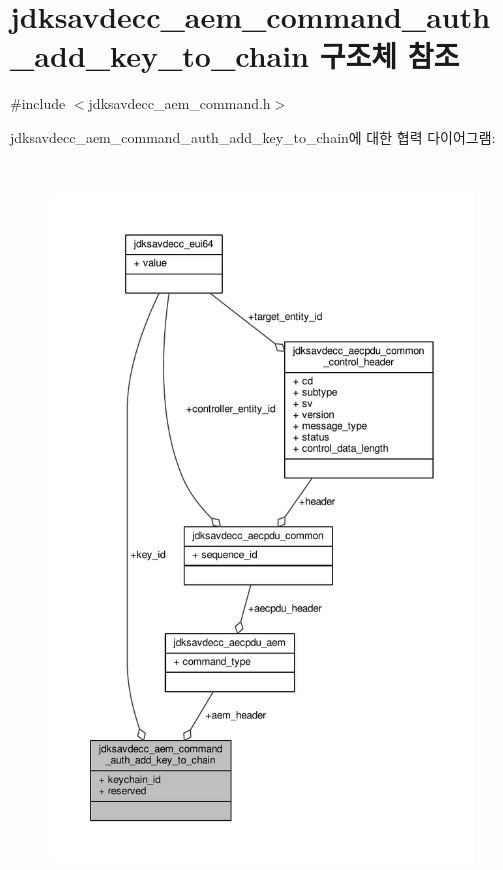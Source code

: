 \hypertarget{structjdksavdecc__aem__command__auth__add__key__to__chain}{}\section{jdksavdecc\+\_\+aem\+\_\+command\+\_\+auth\+\_\+add\+\_\+key\+\_\+to\+\_\+chain 구조체 참조}
\label{structjdksavdecc__aem__command__auth__add__key__to__chain}


{\ttfamily \#include $<$jdksavdecc\+\_\+aem\+\_\+command.\+h$>$}



jdksavdecc\+\_\+aem\+\_\+command\+\_\+auth\+\_\+add\+\_\+key\+\_\+to\+\_\+chain에 대한 협력 다이어그램\+:
\nopagebreak
\begin{figure}[H]
\begin{center}
\leavevmode
\includegraphics[height=550pt]{structjdksavdecc__aem__command__auth__add__key__to__chain__coll__graph}
\end{center}
\end{figure}
